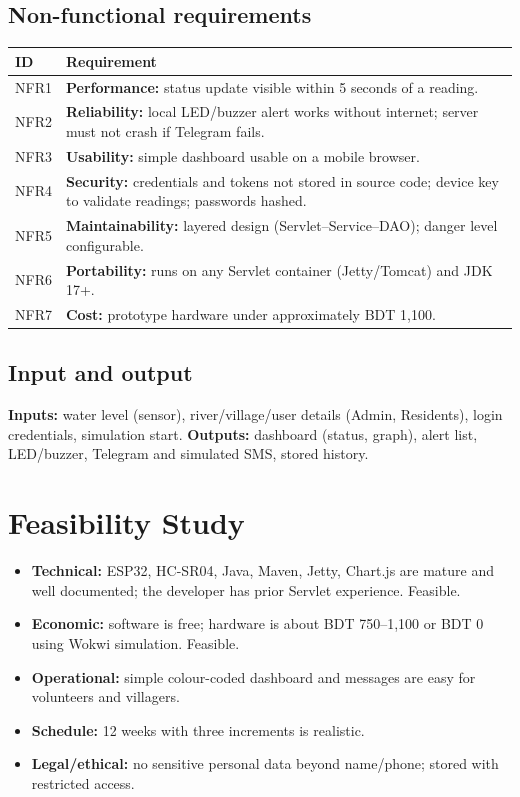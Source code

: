 \documentclass[12pt,a4paper]{article}
\begin{document}
\subsection{Non-functional requirements}
\begin{longtable}{@{}lp{}@{}}
\toprule\textbf{ID} & \textbf{Requirement}\\\midrule\endhead
NFR1 & \textbf{Performance:} status update visible within 5 seconds of a reading.\\
NFR2 & \textbf{Reliability:} local LED/buzzer alert works without internet; server must not crash if Telegram fails.\\
NFR3 & \textbf{Usability:} simple dashboard usable on a mobile browser.\\
NFR4 & \textbf{Security:} credentials and tokens not stored in source code; device key to validate readings; passwords hashed.\\
NFR5 & \textbf{Maintainability:} layered design (Servlet--Service--DAO); danger level configurable.\\
NFR6 & \textbf{Portability:} runs on any Servlet container (Jetty/Tomcat) and JDK 17+.\\
NFR7 & \textbf{Cost:} prototype hardware under approximately BDT 1{,}100.\\\bottomrule
\end{longtable}
\subsection{Input and output}
\textbf{Inputs:} water level (sensor), river/village/user details (Admin, Residents), login credentials, simulation start. \textbf{Outputs:} dashboard (status, graph), alert list, LED/buzzer, Telegram and simulated SMS, stored history.

\section{Feasibility Study}
\begin{itemize}[noitemsep]
\item \textbf{Technical:} ESP32, HC-SR04, Java, Maven, Jetty, Chart.js are mature and well documented; the developer has prior Servlet experience. Feasible.
\item \textbf{Economic:} software is free; hardware is about BDT 750--1{,}100 or BDT 0 using Wokwi simulation. Feasible.
\item \textbf{Operational:} simple colour-coded dashboard and messages are easy for volunteers and villagers.
\item \textbf{Schedule:} 12 weeks with three increments is realistic.
\item \textbf{Legal/ethical:} no sensitive personal data beyond name/phone; stored with restricted access.
\end{itemize}
\end{document}
